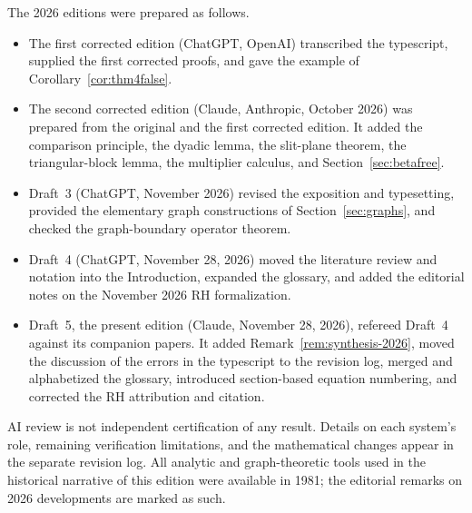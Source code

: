 \documentclass[12pt,letterpaper]{article}
\theoremstyle{definition}
\theoremstyle{remark}
\numberwithin{equation}{section}
\begin{document}
The 2026 editions were prepared as follows.
\begin{itemize}
\item The first corrected edition (ChatGPT, OpenAI) transcribed the
  typescript, supplied the first corrected proofs, and gave the example
  of Corollary~\ref{cor:thm4false}.
\item The second corrected edition (Claude, Anthropic, October 2026)
  was prepared from the original and the first corrected edition.  It
  added the comparison principle, the dyadic lemma, the slit-plane
  theorem, the triangular-block lemma, the multiplier calculus, and
  Section~\ref{sec:betafree}.
\item Draft~3 (ChatGPT, November 2026) revised the exposition and
  typesetting, provided the elementary graph constructions of
  Section~\ref{sec:graphs}, and checked the graph-boundary operator
  theorem.
\item Draft~4 (ChatGPT, November 28, 2026) moved the literature review and
  notation into the Introduction, expanded the glossary, and added the
  editorial notes on the November 2026 RH formalization.
\item Draft~5, the present edition (Claude, November 28, 2026), refereed
  Draft~4 against its companion papers.  It added
  Remark~\ref{rem:synthesis-2026}, moved the discussion of the errors in
  the typescript to the revision log, merged and alphabetized the glossary,
  introduced section-based equation numbering, and corrected the RH
  attribution and citation.
\end{itemize}
AI review is not independent certification of any result.  Details on
each system's role, remaining verification limitations, and the
mathematical changes appear in the separate revision log.  All analytic
and graph-theoretic tools used in the historical narrative of this
edition were available in 1981; the editorial remarks on 2026
developments are marked as such.
\end{document}
